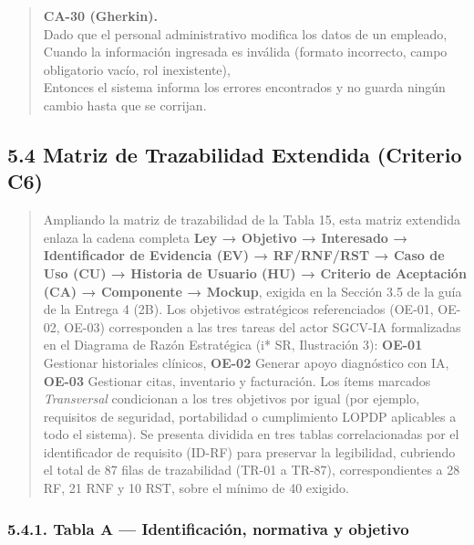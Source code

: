 \documentclass[
]{article}
\begin{document}
\begin{quote}
\textbf{CA-30 (Gherkin).} \\
Dado que el personal administrativo modifica los datos de un empleado, \\
Cuando la información ingresada es inválida (formato incorrecto, campo obligatorio vacío, rol inexistente), \\
Entonces el sistema informa los errores encontrados y no guarda ningún cambio hasta que se corrijan.
\end{quote}
\subsection{5.4 Matriz de Trazabilidad Extendida (Criterio C6)}\label{matriz-de-trazabilidad-extendida}

\begin{quote}
Ampliando la matriz de trazabilidad de la Tabla 15, esta matriz extendida
enlaza la cadena completa \textbf{Ley → Objetivo → Interesado → Identificador
de Evidencia (EV) → RF/RNF/RST → Caso de Uso (CU) → Historia de Usuario (HU)
→ Criterio de Aceptación (CA) → Componente → Mockup}, exigida en la Sección
3.5 de la guía de la Entrega 4 (2B). Los objetivos estratégicos referenciados
(OE-01, OE-02, OE-03) corresponden a las tres tareas del actor SGCV-IA
formalizadas en el Diagrama de Razón Estratégica (i* SR, Ilustración 3):
\textbf{OE-01} Gestionar historiales clínicos, \textbf{OE-02} Generar apoyo
diagnóstico con IA, \textbf{OE-03} Gestionar citas, inventario y facturación.
Los ítems marcados \emph{Transversal} condicionan a los tres objetivos por
igual (por ejemplo, requisitos de seguridad, portabilidad o cumplimiento
LOPDP aplicables a todo el sistema). Se presenta dividida en tres tablas
correlacionadas por el identificador de requisito (ID-RF) para preservar la
legibilidad, cubriendo el total de 87 filas de trazabilidad (TR-01 a
TR-87), correspondientes a 28 RF, 21 RNF y 10 RST, sobre el
mínimo de 40 exigido.
\end{quote}

\subsubsection{5.4.1. Tabla A --- Identificación, normativa y objetivo}\label{matriz-extendida-tabla-a}
\end{document}
